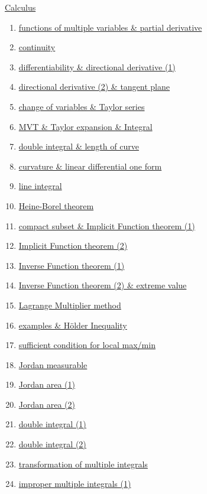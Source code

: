 \documentclass[11pt]{article}
\begin{document}
\newpage 

{\href{https://www.youtube.com/playlist?list=PLVJXJebpO4Pi_4cETi8EL19qJLdcLEW2a&si=YwWo1F4e-o_KZ5_s}{Calculus }}

\vspace{-0.5cm}

\begin{enumerate}
	\item \href{URL}{functions of multiple variables \& partial derivative}	%
	\item \href{URL}{continuity}	%
	\item \href{URL}{differentiability \& directional derivative (1)}	%
	\item \href{URL}{directional derivative (2) \& tangent plane}	%
	\item \href{URL}{change of variables \& Taylor series}	%
	\item \href{URL}{MVT \& Taylor expansion \& Integral}	%
	\item \href{URL}{double integral \& length of curve}	%
	\item \href{URL}{curvature \& linear differential one form}	%
	\item \href{URL}{line integral}	%
	\item \href{URL}{Heine-Borel theorem}	%
	\item \href{URL}{compact subset \& Implicit Function theorem (1)}	%
	\item \href{URL}{Implicit Function theorem (2)}	%
	\item \href{URL}{Inverse Function theorem (1)}	%
	\item \href{URL}{Inverse Function theorem (2) \& extreme value}	%
	\item \href{URL}{Lagrange Multiplier method}	%
	\item \href{URL}{examples \& H{\"o}lder Inequality}	%
	\item \href{URL}{sufficient condition for local max/min}	%
	\item \href{URL}{Jordan measurable}	%
	\item \href{URL}{Jordan area (1)}	%
	\item \href{URL}{Jordan area (2)}	%
	\item \href{URL}{double integral (1)}	%
	\item \href{URL}{double integral (2)}	%
	\item \href{URL}{transformation of multiple integrals}	%
	\item \href{URL}{improper multiple integrals (1)}	%

\end{enumerate}
\end{document}
